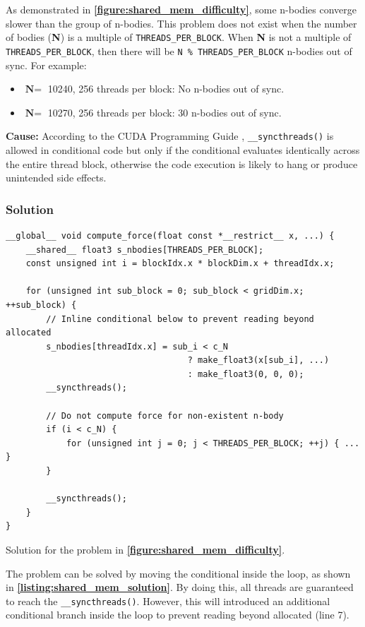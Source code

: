 \documentclass[12pt, a4paper]{article}
\let\oldcref\cref
\renewcommand{\cref}[1]{\textbf{\oldcref{#1}}}
\begin{document}
As demonstrated in \cref{figure:shared_mem_difficulty}, some n-bodies converge slower than the group
of n-bodies. This problem does not exist when the number of bodies (\textbf{N}) is a multiple of
\texttt{THREADS\_PER\_BLOCK}. When \textbf{N} is not a multiple of \texttt{THREADS\_PER\_BLOCK},
then there will be \texttt{N \% THREADS\_PER\_BLOCK} n-bodies out of sync. For example:
\begin{itemize}
  \item $\textbf{N} =$ 10240, 256 threads per block: No n-bodies out of sync.
  \item $\textbf{N} =$ 10270, 256 threads per block: 30 n-bodies out of sync.
\end{itemize}

\textbf{Cause:} According to the CUDA Programming Guide \cite{sync_functions},
\texttt{\_\_syncthreads()} is allowed in conditional code but only if the conditional evaluates
identically across the entire thread block, otherwise the code execution is likely to hang or
produce unintended side effects.

\subsubsection{Solution}
\begin{listing}[H]
  \begin{verbatim}
__global__ void compute_force(float const *__restrict__ x, ...) {
    __shared__ float3 s_nbodies[THREADS_PER_BLOCK];
    const unsigned int i = blockIdx.x * blockDim.x + threadIdx.x;

    for (unsigned int sub_block = 0; sub_block < gridDim.x; ++sub_block) {
        // Inline conditional below to prevent reading beyond allocated
        s_nbodies[threadIdx.x] = sub_i < c_N
                                    ? make_float3(x[sub_i], ...)
                                    : make_float3(0, 0, 0);
        __syncthreads();

        // Do not compute force for non-existent n-body
        if (i < c_N) {
            for (unsigned int j = 0; j < THREADS_PER_BLOCK; ++j) { ... }
        }

        __syncthreads();
    }
}
  \end{verbatim}
  \caption{Solution for the problem in \cref{figure:shared_mem_difficulty}.}
  \label{listing:shared_mem_solution}
\end{listing}

The problem can be solved by moving the conditional inside the loop, as shown in
\cref{listing:shared_mem_solution}. By doing this, all threads are guaranteed to reach the
\texttt{\_\_syncthreads()}. However, this will introduced an additional conditional branch inside
the loop to prevent reading beyond allocated (line 7).
\end{document}
